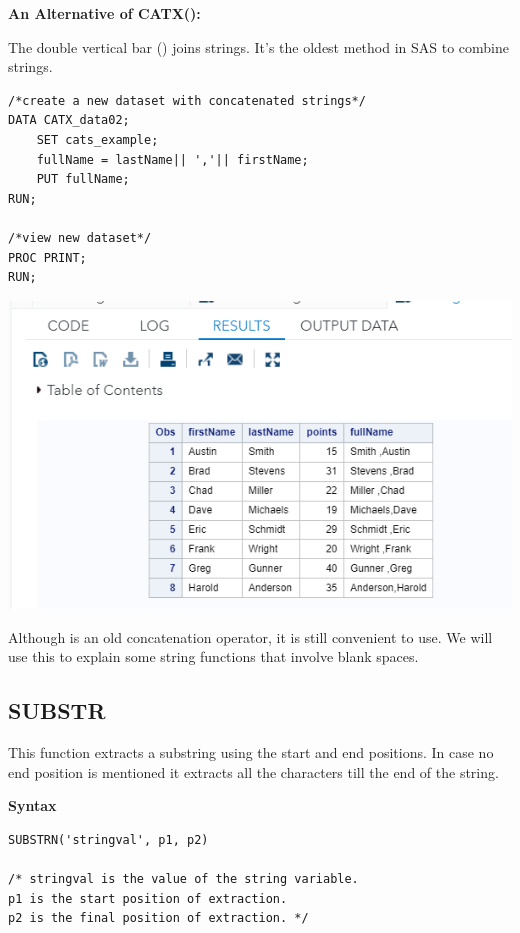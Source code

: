 \documentclass[
]{book}
\begin{document}
\textbf{An Alternative of CATX(): \texttt{\textbar{}\textbar{}}}

The double vertical bar (\texttt{\textbar{}\textbar{}}) joins strings. It's the oldest method in SAS to combine strings.

\begin{verbatim}
/*create a new dataset with concatenated strings*/
DATA CATX_data02;
    SET cats_example;
    fullName = lastName|| ','|| firstName; 
    PUT fullName;
RUN;

/*view new dataset*/
PROC PRINT; 
RUN;
\end{verbatim}

\begin{center}\includegraphics[width=1\linewidth]{img10/w10-CATX-alter-output} \end{center}

Although \texttt{\textbar{}\textbar{}} is an old concatenation operator, it is still convenient to use. We will use this to explain some string functions that involve blank spaces.

\hypertarget{substr}{%
\subsection{SUBSTR}\label{substr}}

This function extracts a substring using the start and end positions. In case no end position is mentioned it extracts all the characters till the end of the string.

\textbf{Syntax}

\begin{verbatim}
SUBSTRN('stringval', p1, p2)

/* stringval is the value of the string variable.
p1 is the start position of extraction.
p2 is the final position of extraction. */
\end{verbatim}
\end{document}
